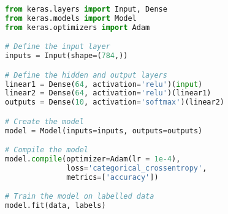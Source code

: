\begin{lstlisting}[float={ht},caption={An small code snippet defining a simple model with an input of a 1D tensor of length 784, two hidden layers both containing 64 units with ReLU actiation functions, and an output layer containing 10 units using the softmax activation function.},label={lst:one},language=Python,upquote=true]
from keras.layers import Input, Dense
from keras.models import Model
from keras.optimizers import Adam

# Define the input layer
inputs = Input(shape=(784,))

# Define the hidden and output layers
linear1 = Dense(64, activation='relu')(input)
linear2 = Dense(64, activation='relu')(linear1)
outputs = Dense(10, activation='softmax')(linear2)

# Create the model
model = Model(inputs=inputs, outputs=outputs)

# Compile the model
model.compile(optimizer=Adam(lr = 1e-4),
              loss='categorical_crossentropy',
              metrics=['accuracy'])

# Train the model on labelled data
model.fit(data, labels)
\end{lstlisting}